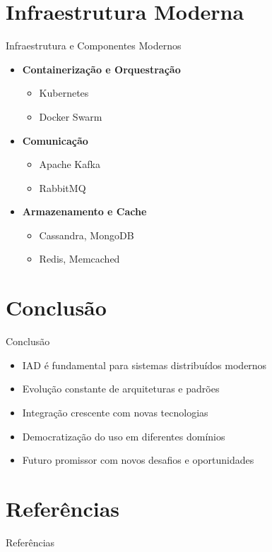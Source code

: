 \documentclass[aspectratio=169,xcolor=table]{beamer}
\begin{document}
\section{Infraestrutura Moderna}
\begin{frame}{Infraestrutura e Componentes Modernos}
    \begin{itemize}
        \item \textbf{Containerização e Orquestração}
        \begin{itemize}
            \item Kubernetes
            \item Docker Swarm
        \end{itemize}
        \item \textbf{Comunicação}
        \begin{itemize}
            \item Apache Kafka
            \item RabbitMQ
        \end{itemize}
        \item \textbf{Armazenamento e Cache}
        \begin{itemize}
            \item Cassandra, MongoDB
            \item Redis, Memcached
        \end{itemize}
    \end{itemize}
\end{frame}

\section{Conclusão}
\begin{frame}{Conclusão}
    \begin{itemize}
        \item IAD é fundamental para sistemas distribuídos modernos
        \item Evolução constante de arquiteturas e padrões
        \item Integração crescente com novas tecnologias
        \item Democratização do uso em diferentes domínios
        \item Futuro promissor com novos desafios e oportunidades
    \end{itemize}
\end{frame}

\section{Referências}
\begin{frame}[allowframebreaks]{Referências}
    \nocite{*}
    
    
\end{frame}
\end{document}
